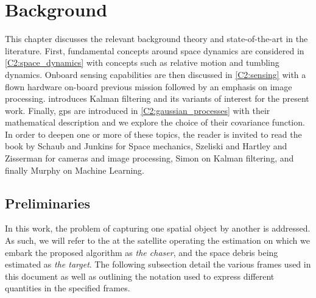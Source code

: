 \chapter{Background}\label{cha:Chapter2}
This chapter discusses the relevant background theory and state-of-the-art in the literature. First, fundamental concepts around space dynamics are considered in \cref{C2:space_dynamics} with concepts such as relative motion and tumbling dynamics. Onboard sensing capabilities are then discussed in \cref{C2:sensing} with a flown hardware on-board previous mission followed by an emphasis on image processing.  introduces Kalman filtering and its variants of interest for the present work. Finally, \gls{gps} are introduced in \cref{C2:gaussian_processes} with their mathematical description and we explore the choice of their covariance function. In order to deepen one or more of these topics, the reader is invited to read the book by Schaub and Junkins \cite{schaub_analytical_2003} for Space mechanics, Szeliski \cite{szeliski_computer_2011} and Hartley and Zisserman \cite{hartley_multiple_2003} for cameras and image processing, Simon \cite{simon_optimal_2006} on Kalman filtering, and finally Murphy \cite{murphy_machine_2012} on Machine Learning.

\section{Preliminaries}\label{C2:notation_ref_frames}
In this work, the problem of capturing one spatial object by another is addressed. As such, we will refer to the at the satellite operating the estimation on which we embark the proposed algorithm as \emph{the chaser}, and the space debris being estimated as \emph{the target}. The following subsection detail the various frames used in this document as well as outlining the notation used to express different quantities in the specified frames.

